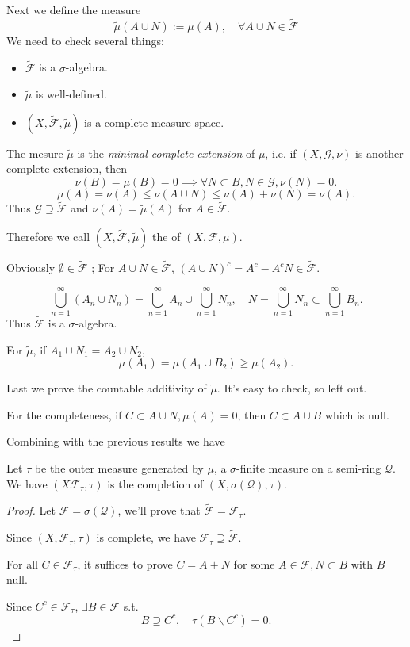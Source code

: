 Next we define the measure
\[
	\widetilde{\mu}(A\cup N) := \mu(A),\quad \forall A\cup N\in \widetilde{\mathscr{F}}
\]
We need to check several things:
\begin{itemize}
	\item $\widetilde{\mathscr{F}}$ is a $\sigma$-algebra.
	\item $\widetilde{\mu}$ is well-defined.
	\item $(X, \widetilde{\mathscr{F}}, \widetilde{\mu})$ is a complete
		measure space.
\end{itemize}
\begin{remark}
    The mesure $\widetilde{\mu}$ is the \textit{minimal complete extension}
	of $\mu$, i.e. if $(X,\mathscr{G},\nu)$ is another complete extension,
	then
	\[
	\nu(B)=\mu(B)=0 \implies \forall N \subset B, N\in \mathscr{G}, \nu(N) = 0.
	\]
	\[
	\mu(A)=\nu(A)\le \nu(A\cup N)\le \nu(A) + \nu(N) = \nu(A).
	\]
	Thus $\mathscr{G}\supseteq \widetilde{\mathscr{F}}$ and $\nu(A)=\widetilde{\mu}(A)$
	for $A\in \widetilde{\mathscr{F}}$.

	Therefore we call $(X,\widetilde{\mathscr{F}},\widetilde{\mu})$ the
	 of $(X,\mathscr{F},\mu)$.
\end{remark}

Obviously $\emptyset\in \widetilde{\mathscr{F}}$ ;
For $A\cup N\in \widetilde{\mathscr{F}}$,
$(A\cup N)^c = A^c - A^cN\in \widetilde{\mathscr{F}}$.

\[
\bigcup_{n=1}^\infty (A_n\cup N_n)=\bigcup_{n=1}^\infty A_n \cup \bigcup_{n=1}^\infty N_n,
\quad N = \bigcup_{n=1}^\infty N_n \subset \bigcup_{n=1}^\infty B_n.
\]
Thus $\widetilde{\mathscr{F}}$ is a $\sigma$-algebra.

For  $\widetilde{\mu}$, if $A_1\cup N_1=A_2\cup N_2$,
\[
\mu(A_1)=\mu(A_1\cup B_2)\ge \mu(A_2).
\]

Last we prove the countable additivity of $\widetilde{\mu}$.
It's easy to check, so left out.

For the completeness, if $C \subset A\cup N, \mu(A)=0$,
then $C \subset A\cup B$ which is null.

Combining with the previous results we have
\begin{theorem}
    Let $\tau$ be the outer measure generated by $\mu$,
	a $\sigma$-finite measure on a semi-ring $ \mathscr{Q}$.
	We have $(X \mathscr{F}_\tau,\tau)$ is
	the completion of $(X,\sigma(\mathscr{Q}), \tau)$.
\end{theorem}
\begin{proof}[Proof]
    Let $\mathscr{F} = \sigma(\mathscr{Q})$, we'll prove that
	$\widetilde{\mathscr{F}} = \mathscr{F}_\tau$.

	Since $(X,\mathscr{F}_\tau,\tau)$ is complete, we have $\mathscr{F}_\tau
	\supseteq \widetilde{\mathscr{F}}$.

	For all $C\in \mathscr{F}_\tau$, it suffices to
	prove $C = A+N$ for some
	$A\in \mathscr{F}, N \subset B$ with $B$ null.

	Since $C^c\in \mathscr{F}_\tau$, $\exists B\in \mathscr{F}$ s.t.
	\[
	B\supseteq C^c,\quad \tau(B\backslash C^c) = 0.
	\]
\end{proof}

